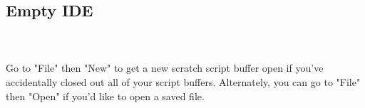 


\subsection{Empty IDE}

\begin{minipage}{\linewidth}
        
        \label{fig: IDEempty} 
\end{minipage}

~\\~\\ 
Go to "File" then "New" to get a new scratch script buffer open if you've accidentally closed out all of your script buffers. Alternately, you can go to "File" then "Open" if you'd like to open a saved file. 


